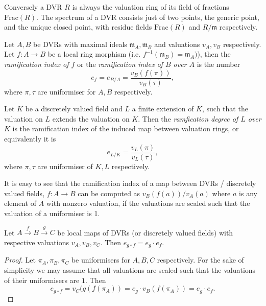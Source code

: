 Conversely a DVR  $R$ is always the valuation ring of its field of fractions $\mathrm{Frac}(R)$. 
The spectrum of a DVR consists just of two points, the generic point, and the unique closed point, with residue fields $\mathrm{Frac}(R)$ and $R / \mathfrak{m} $ respectively. 

\begin{definition}
	Let $A, B$ be DVRs with maximal ideals $\mathfrak{m}_A, \mathfrak{m} _B$ and valuations $v_A, v_B$ respectively.
	Let $f: A \to B$ be a local ring morphism (i.e. $f^{-1}(\mathfrak{m} _B) = \mathfrak{m} _A)$), then the \emph{ramification index of $f$} or the \emph{ramification index of $B$ over $A$} is the number \[
		e_f = e_{B / A}= \frac{v_B(f(\pi))}{v_B(\tau)}
	,\] 
	where $\pi, \tau$ are uniformiser for $A, B$ respectively. 
\end{definition}

\begin{definition}
	Let $K$ be a discretely valued field and $L$ a finite extension of $K$, such that the valuation on $L$ extends the valuation on $K$. 
	Then the \emph{ramfication degree of  $L$ over  $K$} is the ramification index of the induced map between valuation rings, or equivalently it is 
	\[
	e_{L / K}  = \frac{v_L(\pi)}{v_L(\tau)}	,\] 
	where $\pi, \tau$ are uniformiser of $K, L$ respectively. 
\end{definition}

It is easy to see that the ramification index of a map between DVRs / discretely valued fields, $f: A \to B$ can be computed as $v_B(f(a)) / v_A(a)$ where $a$ is any element of $A$ with nonzero valuation, if the valuations are scaled such that the valuation of a uniformiser is 1. 

\begin{lemma}\label{lem:multiplicative_ramification_degree}
	Let $A \xrightarrow f B \xrightarrow g C$ be local maps of DVRs (or discretely valued fields) with respective valuations $v_A, v_B, v_C$. 
	Then $e_{g \circ f} = e_g \cdot e_f$.
\end{lemma}
\begin{proof}
	Let $\pi_A, \pi_B, \pi_C$ be uniformisers for $A, B, C$ respectively. 
	For the sake of simplicity we may assume that all valuations are scaled such that the valuations of their uniformisers are $1$.  
	Then 
	\[
		e_{g \circ f} = v_C(g(f(\pi_A)) = e_g \cdot  v_B(f(\pi_A)) = e_g\cdot e_f
	.\] 
\end{proof}


